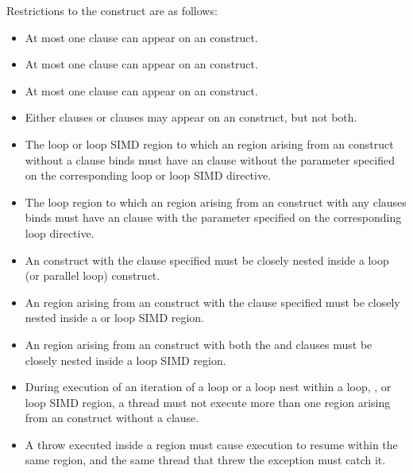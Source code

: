 

\restrictions
Restrictions to the  construct are as follows:

\begin{itemize}
\item At most one  clause can appear on an  construct.

\item At most one  clause can appear on an  construct.

\item At most one  clause can appear on an  construct.

\item Either  clauses or 
clauses may appear on an  construct, but not both.

\item The loop or loop SIMD region to which an 
region arising from an  construct without a 
clause binds must have an  clause without the parameter
specified on the corresponding loop or loop SIMD directive.

\item The loop region to which an  region arising from an
 construct with any 
clauses binds must have an  clause with the parameter specified 
on the corresponding loop directive. 

\item An  construct with the  clause specified must
be closely nested inside a loop (or parallel loop) construct. 

\item An  region arising from an  construct with
the  clause specified must be closely nested inside a
 or loop SIMD region.

\item An  region arising from an  construct with
  both the  and  clauses must be closely nested inside
  a loop SIMD region.
  
\item During execution of an iteration of a loop or a loop nest within a loop, , or loop SIMD
region, a thread must not execute more than one  region arising
from an  construct without a  clause. 
\end{itemize}
\begin{cppspecific}
\begin{itemize}
\item A throw executed inside a  region must cause execution to 
resume within the same  region, and the same thread that threw 
the exception must catch it.
\end{itemize}
\end{cppspecific}



